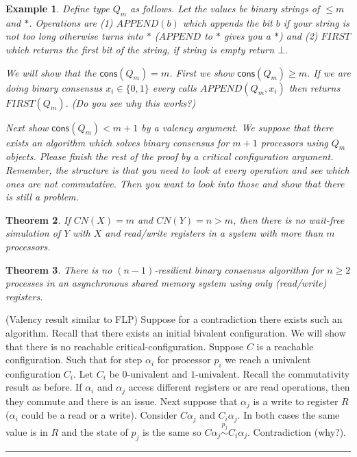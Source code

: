 \documentclass[twoside]{article}
\newcounter{lecnum}
\newtheorem{theorem}{Theorem}[lecnum]
\newtheorem{example}[theorem]{Example}
\newenvironment{proof}{{\bf Proof:}}{\hfill\rule{2mm}{2mm}}
\newcommand\consF{\mathsf{cons}}
\begin{document}
\begin{example}
Define type $Q_m$ as follows. Let the values be binary strings of $\leq m$ and $*$. Operations are (1) $APPEND(b)$ which appends the bit $b$ if your string is not too long otherwise turns into $*$ ($APPEND$ to $*$ gives you a $*$) and (2) $FIRST$ which returns the first bit of the string, if string is empty return $\bot$. 

We will show that the $\consF(Q_m) = m$. First we show $\consF(Q_m) \geq m$. If we are doing binary consensus $x_i \in \{0,1\}$ every calls $APPEND(Q_m, x_i)$ then returns $FIRST(Q_m)$. (Do you see why this works?)

Next show $\consF(Q_m) < m+1$ by a valency argument. We suppose that there exists an algorithm which solves binary consensus for $m+1$ processors using $Q_m$ objects. Please finish the rest of the proof by a critical configuration argument. Remember, the structure is that you need to look at every operation and see which ones are not commutative. Then you want to look into those and show that there is still a problem.  

\end{example}

\begin{theorem}
If $CN(X) = m$ and $CN(Y) = n > m$, then there is no wait-free simulation of $Y$ with $X$ and read/write registers in a system with more than $m$ processors.
\end{theorem}

\begin{theorem}
There is no $(n-1)$-resilient binary consensus algorithm for $n\geq 2$ processes in an asynchronous shared memory system using only (read/write) registers.
\end{theorem}
\begin{proof}
(Valency result similar to FLP) Suppose for a contradiction there exists such an algorithm. Recall that there exists an initial bivalent configuration. We will show that there is no reachable critical-configuration. Suppose $C$ is a reachable configuration. Such that for step $\alpha_i$ for processor $p_i$ we reach a univalent configuration $C_i$. Let $C_i$ be $0$-univalent and $1$-univalent. Recall the commutativity result as before. If $\alpha_i$ and $\alpha_j$ access different registers or are read operations, then they commute and there is an issue. Next suppose that $\alpha_j$ is a write to register $R$ ($\alpha_i$ could be a read or a write). Consider $C\alpha_j$ and $C_i\alpha_j$. In both cases the same value is in $R$ and the state of $p_j$ is the same so $C\alpha_j \stackrel{p_j}{\sim} C_i\alpha_j$. Contradiction (why?). 
\end{proof}
\end{document}
